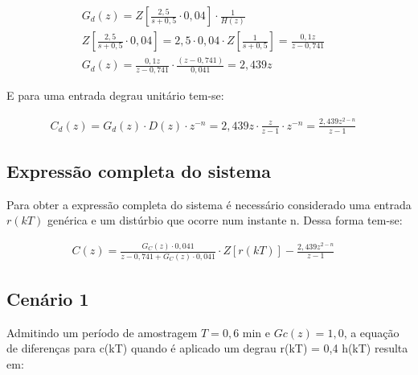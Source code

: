 \documentclass[a4paper,12pt]{article}
\begin{document}
			\begin{equation}
				\left.
				\begin{array}{c}
					\displaystyle G_d(z) = Z\left[\frac{2,5}{s+0,5} \cdot 0,04\right] \cdot \frac{1}{H(z)}  \\[20pt]
					
					\displaystyle Z\left[\frac{2,5}{s+0,5} \cdot 0,04\right] = 2,5 \cdot 0,04 \cdot Z\left[\frac{1}{s+0,5} \right] = \frac{0,1z}{z-0,741} \\[20pt]
					
					\displaystyle G_d(z) = \frac{0,1z}{z-0,741} \cdot \frac{(z-0,741)}{0,041} = 2,439z
					
				\end{array}
				\right.
				\quad 
			\end{equation}
			
			E para uma entrada degrau unitário tem-se:
			
			\begin{equation}
				\left.
				\begin{array}{c}
					\displaystyle C_d(z) = G_d(z) \cdot D(z) \cdot z^{-n} = 2,439z \cdot \frac{z}{z-1} \cdot z^{-n} = \frac{2,439z^{2-n}}{z-1} 
					
				\end{array}
				\right.
				\quad 
			\end{equation}
						
			
		\subsection{Expressão completa do sistema}
			Para obter a expressão completa do sistema é necessário considerado uma entrada $r(kT)$ genérica e um distúrbio que ocorre num instante n. Dessa forma tem-se:
			
			\begin{equation}
				\left.
				\begin{array}{c}
					\displaystyle C(z) = \frac{G_C(z) \cdot 0,041}{z - 0,741 + G_C(z) \cdot 0,041} \cdot Z\left[r(kT)\right] - \frac{2,439z^{2-n}}{z-1}
				\end{array}
				\right.
				\quad 
			\end{equation}
			
		\subsection{Cenário 1}
		
			Admitindo um período de amostragem $T = 0,6$ min e $Gc(z) = 1,0$, a equação de diferenças para c(kT) quando é aplicado um degrau r(kT) = 0,4 h(kT) resulta em:
			
\end{document}

